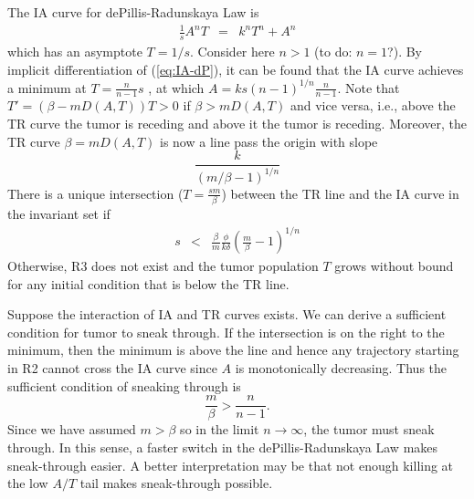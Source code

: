 \documentclass[review,authoryear]{elsarticle}
\begin{document}
The IA curve for dePillis-Radunskaya Law is
\begin{eqnarray}
\frac{1}{s}A^{n}T & = & k^{n}T^{n}+A^{n}\label{eq:IA-dP}
\end{eqnarray}
which has an asymptote $T=1/s$. Consider here $n>1$ (to do: $n=1$?).
By implicit differentiation of (\ref{eq:IA-dP}), it can be found
that the IA curve achieves a minimum at $T=\frac{n}{n-1}s$ , at which
$A=ks(n-1)^{1/n}\frac{n}{n-1}$. Note that $T'=(\beta-mD(A,T))T>0$
if $\beta>mD(A,T)$ and vice versa, i.e., above the TR curve the tumor
is receding and above it the tumor is receding. Moreover, the TR curve
$\beta=mD(A,T)$ is now a line pass the origin with slope 
\[
\frac{k}{(m/\beta-1)^{1/n}}
\]
 There is a unique intersection ($T=\frac{sm}{\beta}$) between the
TR line and the IA curve in the invariant set if 
\begin{eqnarray}
s & < & \frac{\beta}{m}\frac{\phi}{k\delta}(\frac{m}{\beta}-1)^{1/n}\label{eq:s<}
\end{eqnarray}
  Otherwise, R3 does not exist and the tumor population $T$ grows
without bound for any initial condition that is below the TR line. 

Suppose the interaction of IA and TR curves exists. We can derive
a sufficient condition for tumor to sneak through. If the intersection
is on the right to the minimum, then the minimum is above the line
and hence any trajectory starting in R2 cannot cross the IA curve
since $A$ is monotonically decreasing. Thus the sufficient condition
of sneaking through is 
\begin{equation}
\frac{m}{\beta}>\frac{n}{n-1}.\label{eq:sneak-thru-cond}
\end{equation}
Since we have assumed $m>\beta$ so in the limit $n\to\infty$, the
tumor must sneak through. In this sense, a faster switch in the dePillis-Radunskaya
Law makes sneak-through easier. A better interpretation may be that
not enough killing at the low $A/T$ tail makes sneak-through possible. 
\end{document}
